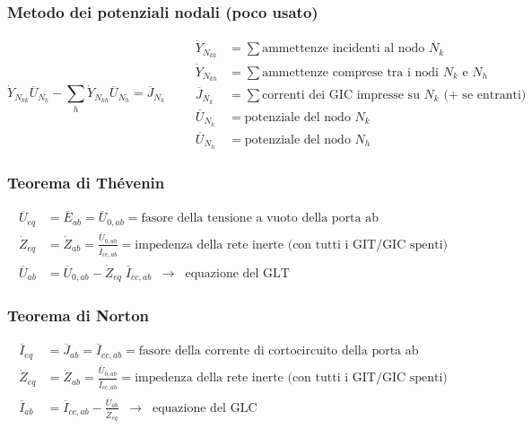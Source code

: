 \documentclass[a4paper]{article}
\begin{document}
\subsubsection*{Metodo dei potenziali nodali (poco usato)}
\[\dot{Y}_{N_{kk}} \overline{U}_{N_k} - \sum_{h} \dot{Y}_{N_{kh}} \overline{U}_{N_h} = \overline{J}_{N_k} \qquad
\begin{aligned}
	\dot{Y}_{N_{kk}} &= \sum \text{ammettenze incidenti al nodo } N_k \\
	\dot{Y}_{N_{kh}} &= \sum \text{ammettenze comprese tra i nodi } N_k \text{ e } N_h \\
	\overline{J}_{N_k} &= \sum \text{correnti dei GIC impresse su } N_k \text{ (+ se entranti)} \\
	\overline{U}_{N_k} &= \text{potenziale del nodo } N_k \\
	\overline{U}_{N_h} &= \text{potenziale del nodo } N_h
\end{aligned}\]

\subsubsection*{Teorema di Thévenin}
\begin{align*}
	\overline{U}_{eq} &= \overline{E}_{ab} = \overline{U}_{0,ab} = \text{fasore della tensione a vuoto della porta ab} \\
	\dot{Z}_{eq} &= \dot{Z}_{ab} = \frac{\overline{U}_{0,ab}}{\overline{I}_{cc,ab}} = \text{impedenza della rete inerte (con tutti i GIT/GIC spenti)} \\
	\overline{U}_{ab} &= \overline{U}_{0,ab} - \dot{Z}_{eq} \; \overline{I}_{cc,ab} \;\;\rightarrow\;\; \text{equazione del GLT}
\end{align*}

\subsubsection*{Teorema di Norton}
\begin{align*}
	\overline{I}_{eq} &= \overline{J}_{ab} = \overline{I}_{cc,ab} = \text{fasore della corrente di cortocircuito della porta ab} \\
	\dot{Z}_{eq} &= \dot{Z}_{ab} = \frac{\overline{U}_{0,ab}}{\overline{I}_{cc,ab}} = \text{impedenza della rete inerte (con tutti i GIT/GIC spenti)} \\
	\overline{I}_{ab} &= \overline{I}_{cc,ab} - \frac{\overline{U}_{ab}}{\dot{Z}_{eq}} \;\;\rightarrow\;\; \text{equazione del GLC}
\end{align*}
\end{document}
